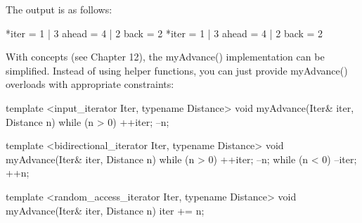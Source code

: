 The output is as follows:

\begin{shell}
*iter = 1 | 3 ahead = 4 | 2 back = 2
*iter = 1 | 3 ahead = 4 | 2 back = 2
\end{shell}

With concepts (see Chapter 12), the myAdvance() implementation can be simplified. Instead of using helper functions, you can just provide myAdvance() overloads with appropriate constraints:

\begin{cpp}
template <input_iterator Iter, typename Distance>
void myAdvance(Iter& iter, Distance n)
{
    while (n > 0) { ++iter; --n; }
}

template <bidirectional_iterator Iter, typename Distance>
void myAdvance(Iter& iter, Distance n)
{
    while (n > 0) { ++iter; --n; }
    while (n < 0) { --iter; ++n; }
}

template <random_access_iterator Iter, typename Distance>
void myAdvance(Iter& iter, Distance n)
{
    iter += n;
}
\end{cpp}









